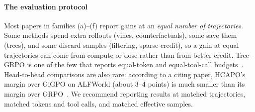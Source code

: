 \paragraph{The evaluation protocol}
Most papers in families (a)--(f) report gains at an \emph{equal number of trajectories}. Some methods spend extra rollouts (vines, counterfactuals), some save them (trees), and some discard samples (filtering, sparse credit), so a gain at equal trajectories can come from compute or dose rather than from better credit. Tree-GRPO is one of the few that reports equal-token and equal-tool-call budgets~\citep{ji2025tree}. Head-to-head comparisons are also rare: according to a citing paper, HCAPO's margin over GiGPO on ALFWorld (about 3--4 points) is much smaller than its margin over GRPO~\citep{vict2026verifier}\unverified. We recommend reporting results at matched trajectories, matched tokens and tool calls, and matched effective samples.
